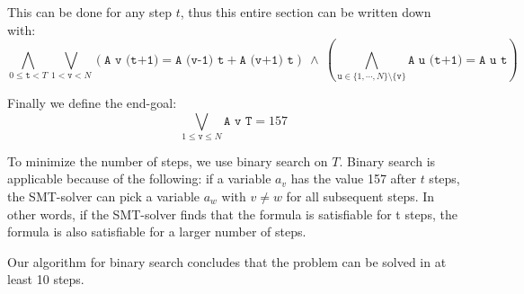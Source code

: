 \documentclass[12pt]{article}
\begin{document}
This can be done for any step $t$, thus this entire section can be written down with:
\[
    \bigwedge_{0 \le \texttt{t} < T}
    \bigvee_{1 < \texttt{v} < N}
        \left (\texttt{A v (t+1)} = \texttt{A (v-1) t} + \texttt{A (v+1) t} \right)
        ~\wedge~
        \left( \bigwedge_{ \texttt{u} \in \{1, \cdots, N\} \setminus \{ \texttt{v} \} } \texttt{A u (t+1)} = \texttt{A u t} \right)
\]

Finally we define the end-goal:
\[ \bigvee_{1 \le \texttt{v} \le N} \texttt{A v T} = 157 \]

To minimize the number of steps, we use binary search on $T$.
Binary search is applicable because of the following:
if a variable $a_v$ has the value 157 after $t$ steps, the SMT-solver can pick a variable $a_w$ with $v \ne w$ for all subsequent steps.
In other words, 
if the SMT-solver finds that the formula is satisfiable for t steps, 
the formula is also satisfiable for a larger number of steps.


Our algorithm for binary search concludes that the problem can be solved in at least 10 steps.
\end{document}

